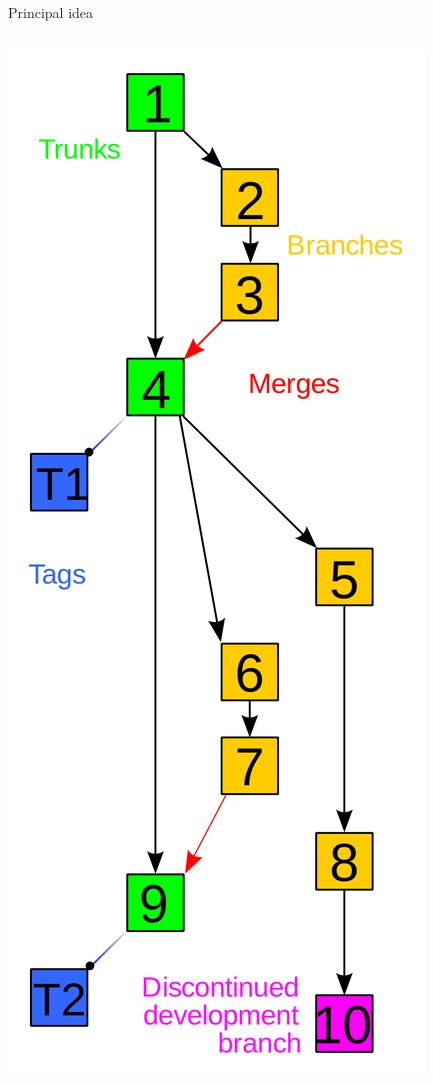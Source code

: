 \documentclass[xcolor=table,compress]{beamer}
\begin{document}
\begin{frame}{Principal idea}
\begin{columns}

\begin{column}{.48\textwidth}
\includegraphics[height=.7\textheight]{Revision_controlled_project_visualization-2010-24-02.png}

\end{column}
\end{columns}
\end{frame}
\end{document}
